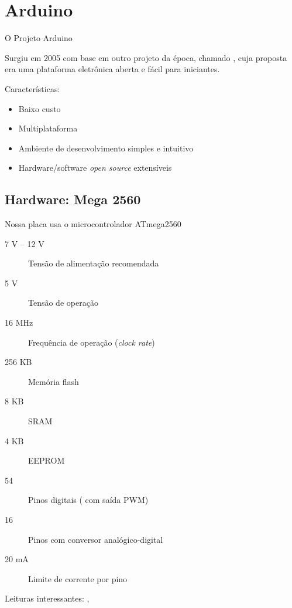 
\section{Arduino}


\begin{frame}{O Projeto Arduino}

	Surgiu em 2005 com base em outro projeto da época, chamado , cuja proposta era uma plataforma eletrônica aberta e fácil para iniciantes.

	\medskip
	Características:
	\begin{itemize}
		\item Baixo custo
		\item Multiplataforma
		\item Ambiente de desenvolvimento simples e intuitivo
		\item Hardware/software \textit{open source} extensíveis
	\end{itemize}

\end{frame}


\subsection{Hardware: Mega 2560}


\begin{frame}{\insertsubsection}

	Nossa placa usa o microcontrolador ATmega2560
	\begin{description}
		\item[7 V -- 12 V] Tensão de alimentação recomendada
		\item[5 V] Tensão de operação
		\item[16 MHz] Frequência de operação (\textit{clock rate})
		\item[256 KB] Memória flash
		\item[8 KB] SRAM
		\item[4 KB] EEPROM
		\item[54] Pinos digitais ( com saída PWM)
		\item[16] Pinos com conversor analógico-digital
		\item[20 mA] Limite de corrente por pino
	\end{description}

	\vfill
	Leituras interessantes: , 

\end{frame}


